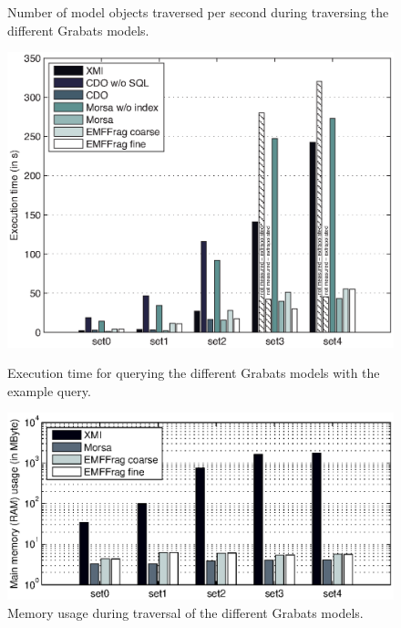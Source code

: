 \begin{figure}[t]
\begin{minipage}[b]{0.48\linewidth}
\caption{Number of model objects traversed per second during traversing the different Grabats models.}
\label{fig:grabatsTraverseTime}
\end{minipage}
\hspace{0.02\linewidth}
\begin{minipage}[b]{0.48\linewidth}
\centering
\includegraphics[width=\linewidth]{figures/grabatsQueryTimeExtra}
\caption{Execution time for querying the different Grabats models with the example query.}
\label{fig:grabatsQueryTime}
\end{minipage}
\begin{minipage}[b]{0.48\linewidth}
\centering
\includegraphics[width=\linewidth]{figures/grabatsTraverseMem}
\caption{Memory usage during traversal of the different Grabats models.}
\label{fig:grabatsTraverseMem}
\end{minipage}

\end{figure}
